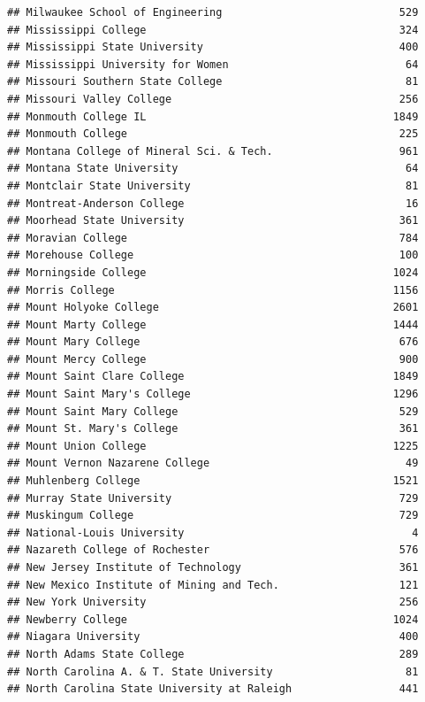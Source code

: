 \documentclass[
]{article}
\begin{document}
\begin{verbatim}
## Milwaukee School of Engineering                            529
## Mississippi College                                        324
## Mississippi State University                               400
## Mississippi University for Women                            64
## Missouri Southern State College                             81
## Missouri Valley College                                    256
## Monmouth College IL                                       1849
## Monmouth College                                           225
## Montana College of Mineral Sci. & Tech.                    961
## Montana State University                                    64
## Montclair State University                                  81
## Montreat-Anderson College                                   16
## Moorhead State University                                  361
## Moravian College                                           784
## Morehouse College                                          100
## Morningside College                                       1024
## Morris College                                            1156
## Mount Holyoke College                                     2601
## Mount Marty College                                       1444
## Mount Mary College                                         676
## Mount Mercy College                                        900
## Mount Saint Clare College                                 1849
## Mount Saint Mary's College                                1296
## Mount Saint Mary College                                   529
## Mount St. Mary's College                                   361
## Mount Union College                                       1225
## Mount Vernon Nazarene College                               49
## Muhlenberg College                                        1521
## Murray State University                                    729
## Muskingum College                                          729
## National-Louis University                                    4
## Nazareth College of Rochester                              576
## New Jersey Institute of Technology                         361
## New Mexico Institute of Mining and Tech.                   121
## New York University                                        256
## Newberry College                                          1024
## Niagara University                                         400
## North Adams State College                                  289
## North Carolina A. & T. State University                     81
## North Carolina State University at Raleigh                 441

\end{verbatim}
\end{document}
